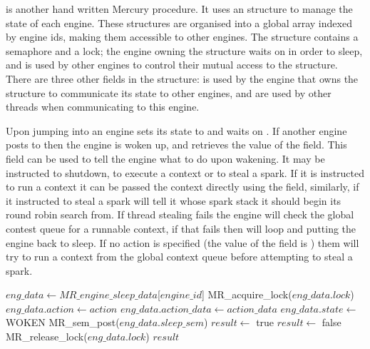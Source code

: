 \sleep is another hand written Mercury procedure.
It uses an
\enginesleepsync structure to manage the state of each engine.
These structures are organised into a global array indexed by engine ids,
making them accessible to other engines.
The structure contains a semaphore and a lock;
the engine owning the structure waits on  in order to
sleep,
and  is used by other engines to control their mutual
access to the \enginesleepsync structure.
There are three other fields in the structure:
 is used by the engine that owns the structure to communicate
its state to other engines,
 and  are used by other threads when
communicating to this engine.

Upon jumping into \idle an engine sets its state to  and
waits on .
If another engine posts to  then the engine is woken up,
and retrieves the value of the  field.
This field can be used to tell the engine what to do upon wakening.
It may be instructed to shutdown, to execute a context or to steal a spark.
If it is instructed to run a context it can be passed the context directly
using the  field,
similarly, if it instructed to steal a spark  will tell
it whose spark stack it should begin its round robin search from.
If thread stealing fails the engine will check the global contest queue for
a runnable context,
if that fails then \idle will loop and putting the engine back to sleep.
If no action is specified
(the value of the  field is )
them \sleep will try to run a context from the global context queue before
attempting to steal a spark.

\begin{algorithm}[tbp]
\begin{algorithmic}
    \State $eng\_data \gets MR\_engine\_sleep\_data$[$engine\_id$]
    \State MR\_acquire\_lock($eng\_data.lock$)
        \State $eng\_data.action \gets action$
        \State $eng\_data.action\_data \gets action\_data$
        \State $eng\_data.state \gets$ WOKEN
        \State MR\_sem\_post($eng\_data.sleep\_sem$)
        \State $result \gets$ true
    \Else
        \State $result \gets$ false
    \EndIf
    \State MR\_release\_lock($eng\_data.lock$)
    \Return $result$
\EndProcedure
\end{algorithmic}
\caption{\wakeengine}
\label{alg:wake_engine}
\end{algorithm}

